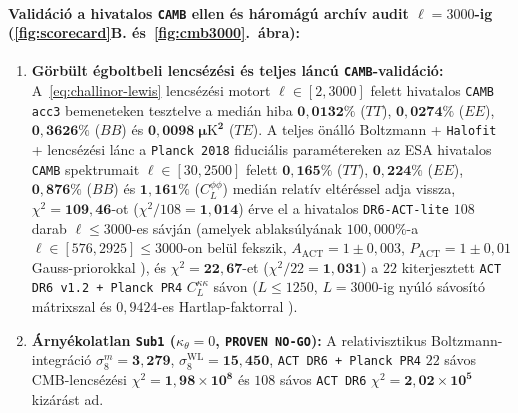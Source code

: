 \documentclass[11pt,a4paper]{article}
\begin{document}
\paragraph{Validáció a hivatalos \texttt{CAMB} ellen és háromágú archív audit $\ell = 3000$-ig (\ref{fig:scorecard}B. és~\ref{fig:cmb3000}.~ábra):}
\begin{enumerate}
  \item \textbf{Görbült égboltbeli lencsézési és teljes láncú \texttt{CAMB}-validáció:} A~\eqref{eq:challinor-lewis} lencsézési motort $\ell \in [2, 3000]$ felett hivatalos \texttt{CAMB acc3} bemeneteken tesztelve a medián hiba $\mathbf{0{,}0132\%}$ ($TT$), $\mathbf{0{,}0274\%}$ ($EE$), $\mathbf{0{,}3626\%}$ ($BB$) és $\mathbf{0{,}0098\;\mu\mathrm{K}^2}$ ($TE$). A teljes önálló Boltzmann + \texttt{Halofit} + lencsézési lánc a \texttt{Planck 2018} fiduciális paramétereken az ESA hivatalos \texttt{CAMB} spektrumait $\ell \in [30, 2500]$ felett $\mathbf{0{,}165\%}$ ($TT$), $\mathbf{0{,}224\%}$ ($EE$), $\mathbf{0{,}876\%}$ ($BB$) és $\mathbf{1{,}161\%}$ ($C_L^{\phi\phi}$) medián relatív eltéréssel adja vissza, $\chi^2 = \mathbf{109{,}46}$-ot ($\chi^2/108 = \mathbf{1{,}014}$) érve el a hivatalos {\upshape\texttt{DR6-ACT-lite}} $108$ darab $\ell \le 3000$-es sávján (amelyek ablaksúlyának $100{,}000\%$-a $\ell \in [576, 2925] \le 3000$-on belül fekszik, $A_{\mathrm{ACT}} = 1 \pm 0{,}003$, $P_{\mathrm{ACT}} = 1 \pm 0{,}01$ Gauss-priorokkal \cite{ACTDR6_Louis2025}), és $\chi^2 = \mathbf{22{,}67}$-et ($\chi^2/22 = \mathbf{1{,}031}$) a $22$ kiterjesztett {\upshape\texttt{ACT DR6 v1.2 + Planck PR4}} $C_L^{\kappa\kappa}$ sávon ($L \le 1250$, $L = 3000$-ig nyúló sávosító mátrixszal és $0{,}9424$-es Hartlap-faktorral \cite{ACTDR6_Qu2024,Carron2022PR4Lensing}).
  \item \textbf{Árnyékolatlan {\upshape\texttt{Sub1}} ($\kappa_\theta = 0$, {\upshape\texttt{PROVEN NO-GO}}):} A relativisztikus Boltzmann-integráció $\sigma_8^m = \mathbf{3{,}279}$, $\sigma_8^{\mathrm{WL}} = \mathbf{15{,}450}$, {\upshape\texttt{ACT DR6 + Planck PR4}} $22$ sávos CMB-lencsézési $\chi^2 = \mathbf{1{,}98\times 10^8}$ és $108$ sávos {\upshape\texttt{ACT DR6}} $\chi^2 = \mathbf{2{,}02\times 10^5}$ kizárást ad.

\end{enumerate}
\end{document}
